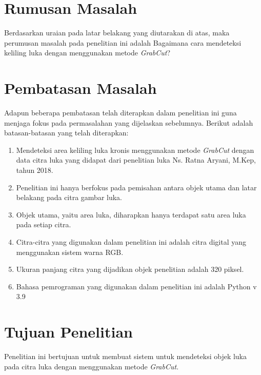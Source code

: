 \section{Rumusan Masalah}
Berdasarkan uraian pada latar belakang yang diutarakan di atas, maka perumusan 
masalah pada penelitian ini adalah Bagaimana cara mendeteksi keliling luka dengan 
menggunakan metode \emph{GrabCut}?

\section{Pembatasan Masalah}
Adapun beberapa pembatasan telah diterapkan dalam penelitian ini guna menjaga fokus 
pada permasalahan yang dijelaskan sebelumnya. Berikut adalah batasan-batasan yang 
telah diterapkan:

\begin{enumerate}
	\item Mendeteksi area keliling luka kronis menggunakan metode \emph{GrabCut} dengan data 
	citra luka yang didapat dari penelitian luka Ns. Ratna Aryani, M.Kep, tahun 2018. 
	\item Penelitian ini hanya berfokus pada pemisahan antara objek utama dan 
	latar belakang pada citra gambar luka.
	\item Objek utama, yaitu area luka, diharapkan hanya terdapat satu area luka pada setiap citra.
	\item Citra-citra yang digunakan dalam penelitian ini adalah citra digital yang menggunakan sistem warna RGB.
	\item Ukuran panjang citra yang dijadikan objek penelitian adalah 320 piksel.
	\item Bahasa pemrograman yang digunakan dalam penelitian ini adalah Python v 3.9
\end{enumerate}

\section{Tujuan Penelitian}
Penelitian ini bertujuan untuk membuat sistem untuk mendeteksi objek luka pada citra luka
dengan menggunakan metode \emph{GrabCut}.


